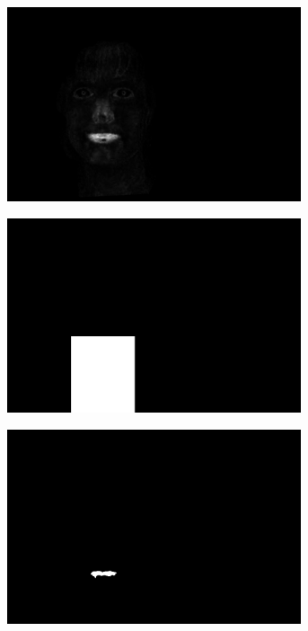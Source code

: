 \begin{figure}[H]
\centering

\begin{subfigure}{.33\textwidth}
  \centering
  \includegraphics[width=0.95\textwidth]{img/fd/MouthMask.png}
  \caption{}
\end{subfigure}%
\begin{subfigure}{.33\textwidth}
  \centering
  \includegraphics[width=0.95\textwidth]{img/fd/notNonMouthMask.png}
  \caption{}
\end{subfigure}%
\begin{subfigure}{.33\textwidth}
  \centering
  \includegraphics[width=0.95\textwidth]{img/fd/MouthBlob.png}
  \caption{}
\end{subfigure}%


\end{figure}
